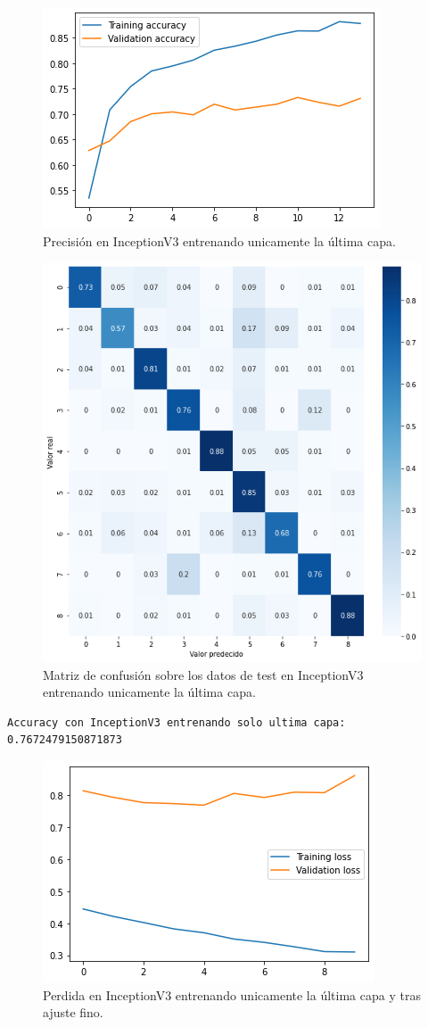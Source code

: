 \begin{figure}[H]
  \centering
  \includegraphics[width=0.5\linewidth]{Imagenes/entrenamiento_redes/ult/inception_ult_acc.png}
  \caption{Precisión en InceptionV3 entrenando unicamente la última capa.}
\end{figure}

\begin{figure}[H]
  \centering
  \includegraphics[width=0.5\linewidth]{Imagenes/entrenamiento_redes/ult/inception_ult_matriz.png}
  \caption{Matriz de confusión sobre los datos de test en InceptionV3 entrenando unicamente la última capa.}
\end{figure}


\begin{lstlisting}
Accuracy con InceptionV3 entrenando solo ultima capa: 0.7672479150871873
\end{lstlisting}


\begin{figure}[H]
  \centering
  \includegraphics[width=0.5\linewidth]{Imagenes/entrenamiento_redes/ult/inception_fine_loss.png}
  \caption{Perdida en InceptionV3 entrenando unicamente la última capa y tras ajuste fino.}
\end{figure}

